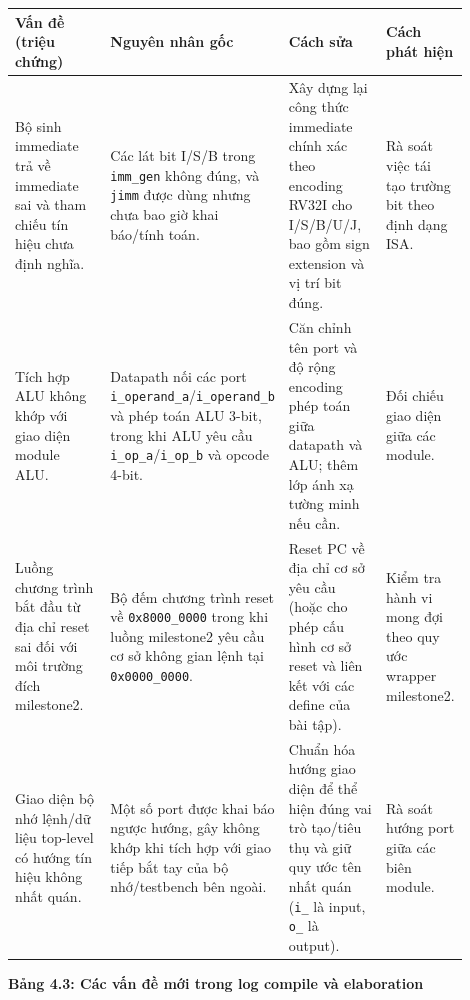 \documentclass[10pt,a4paper]{article}
\begin{document}
\begin{center}
\small
\begin{tabular}{@{}p{0.24\linewidth}p{0.24\linewidth}p{0.24\linewidth}p{0.18\linewidth}@{}}
\toprule
\textbf{Vấn đề (triệu chứng)} & \textbf{Nguyên nhân gốc} & \textbf{Cách sửa} & \textbf{Cách phát hiện} \\
\midrule
Bộ sinh immediate trả về immediate sai và tham chiếu tín hiệu chưa định nghĩa. &
Các lát bit I/S/B trong \texttt{imm\_gen} không đúng, và \texttt{jimm} được dùng nhưng chưa bao giờ khai báo/tính toán. &
Xây dựng lại công thức immediate chính xác theo encoding RV32I cho I/S/B/U/J, bao gồm sign extension và vị trí bit đúng. &
Rà soát việc tái tạo trường bit theo định dạng ISA. \\
\addlinespace
Tích hợp ALU không khớp với giao diện module ALU. &
Datapath nối các port \texttt{i\_operand\_a}/\texttt{i\_operand\_b} và phép toán ALU 3-bit, trong khi ALU yêu cầu \texttt{i\_op\_a}/\texttt{i\_op\_b} và opcode 4-bit. &
Căn chỉnh tên port và độ rộng encoding phép toán giữa datapath và ALU; thêm lớp ánh xạ tường minh nếu cần. &
Đối chiếu giao diện giữa các module. \\
\addlinespace
Luồng chương trình bắt đầu từ địa chỉ reset sai đối với môi trường đích milestone2. &
Bộ đếm chương trình reset về \texttt{0x8000\_0000} trong khi luồng milestone2 yêu cầu cơ sở không gian lệnh tại \texttt{0x0000\_0000}. &
Reset PC về địa chỉ cơ sở yêu cầu (hoặc cho phép cấu hình cơ sở reset và liên kết với các define của bài tập). &
Kiểm tra hành vi mong đợi theo quy ước wrapper milestone2. \\
\addlinespace
Giao diện bộ nhớ lệnh/dữ liệu top-level có hướng tín hiệu không nhất quán. &
Một số port được khai báo ngược hướng, gây không khớp khi tích hợp với giao tiếp bắt tay của bộ nhớ/testbench bên ngoài. &
Chuẩn hóa hướng giao diện để thể hiện đúng vai trò tạo/tiêu thụ và giữ quy ước tên nhất quán (\texttt{i\_} là input, \texttt{o\_} là output). &
Rà soát hướng port giữa các biên module. \\
\bottomrule
\end{tabular}
\end{center}

\textbf{Bảng 4.3: Các vấn đề mới trong log compile và elaboration}
\end{document}
